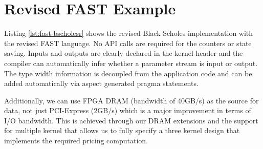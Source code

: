 \section{Revised FAST Example}
\label{sec:fast-ref}

Listing \ref{lst:fast-bscholesr} shows the revised Black Scholes
implementation with the revised FAST language. No API calls are
required for the counters or state saving. Inputs and outputs are
clearly declared in the kernel header and the compiler can
automatically infer whether a parameter stream is input or output. The
type width information is decoupled from the application code and can
be added automatically via aspect generated pragma statements.

Additionally, we can use FPGA DRAM (bandwidth of 40GB/s) as the source
for data, not just PCI-Express (2GB/s) which is a major improvement in
terms of I/O bandwidth. This is achieved through our DRAM extensions
and the support for multiple kernel that allows us to fully specify a
three kernel design that implements the required pricing computation.

